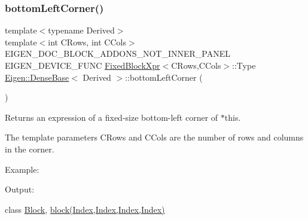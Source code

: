 \subsubsection{\texorpdfstring{bottomLeftCorner()}{bottomLeftCorner()}\hspace{0.1cm}{\footnotesize\ttfamily [2/3]}}
{\footnotesize\ttfamily template$<$typename Derived$>$ \\
template$<$int C\+Rows, int C\+Cols$>$ \\
E\+I\+G\+E\+N\+\_\+\+D\+O\+C\+\_\+\+B\+L\+O\+C\+K\+\_\+\+A\+D\+D\+O\+N\+S\+\_\+\+N\+O\+T\+\_\+\+I\+N\+N\+E\+R\+\_\+\+P\+A\+N\+EL E\+I\+G\+E\+N\+\_\+\+D\+E\+V\+I\+C\+E\+\_\+\+F\+U\+NC \mbox{\hyperlink{struct_eigen_1_1_dense_base_1_1_fixed_block_xpr}{Fixed\+Block\+Xpr}}$<$C\+Rows,C\+Cols$>$\+::Type \mbox{\hyperlink{class_eigen_1_1_dense_base}{Eigen\+::\+Dense\+Base}}$<$ Derived $>$\+::bottom\+Left\+Corner (\begin{DoxyParamCaption}{ }\end{DoxyParamCaption})\hspace{0.3cm}{\ttfamily [inline]}}

\begin{DoxyReturn}{Returns}
an expression of a fixed-\/size bottom-\/left corner of $\ast$this.
\end{DoxyReturn}
The template parameters C\+Rows and C\+Cols are the number of rows and columns in the corner.

Example\+: 
\begin{DoxyCodeInclude}{0}
\end{DoxyCodeInclude}
 Output\+: 
\begin{DoxyVerbInclude}
\end{DoxyVerbInclude}
 class \mbox{\hyperlink{class_eigen_1_1_block}{Block}}, \mbox{\hyperlink{class_eigen_1_1_dense_base_ab8e42e67c5cfd5fa13e684642f0f65bf}{block(\+Index,\+Index,\+Index,\+Index)}} \mbox{\label{class_eigen_1_1_dense_base_a4ce80c44ce2092f18ddecdaaac71b3d0}} 
